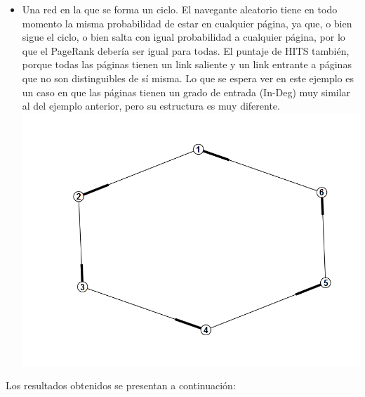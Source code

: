 \documentclass[a4paper]{article}
\begin{document}
\begin{itemize}
\item Una red en la que se forma un ciclo. El navegante aleatorio tiene en todo momento la misma probabilidad de estar en cualquier página, ya que, o bien sigue el ciclo, o bien salta con igual probabilidad a cualquier página, por lo que el PageRank debería ser igual para todas. El puntaje de HITS también, porque todas las páginas tienen un link saliente y un link entrante a páginas que no son distinguibles de sí misma. Lo que se espera ver en este ejemplo es un caso en que las páginas tienen un grado de entrada (In-Deg) muy similar al del ejemplo anterior, pero su estructura es muy diferente. \\
\includegraphics[scale=0.5]{img/hexaG.png}
\end{itemize}
Los resultados obtenidos se presentan a continuación:
\end{document}
